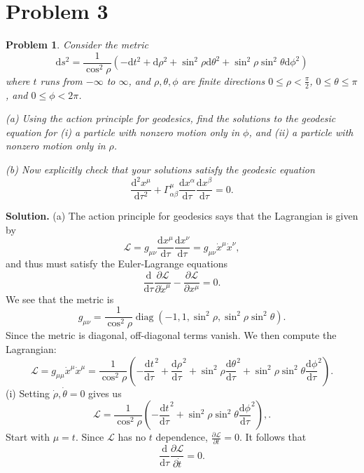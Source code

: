 \documentclass[11pt, letterpaper]{article}
\theoremstyle{plain}
\newtheorem{problem}{Problem}[section]
\begin{document}
\section{Problem 3}
\begin{problem}
	Consider the metric
	\[
		\mathrm{d} s^2=\frac{1}{\cos ^2\rho } \left( -\mathrm{d} t^2+\mathrm{d} \rho ^2+\sin ^2\rho \mathrm{d} \theta ^2+\sin ^2\rho \sin ^2\theta \mathrm{d} \phi ^2 \right) 
	\]
	where $t$ runs from $-\infty$ to $\infty $, and $\rho ,\theta ,\phi $ are finite directions $0\leq \rho < \frac{\pi }{2} $, $0\leq \theta \leq \pi $, and $0\leq \phi <2\pi $.

	(a) Using the action principle for geodesics, find the solutions to the geodesic equation for (i) a particle with nonzero motion only in $\phi $, and (ii) a particle with nonzero motion only in $\rho $.

	(b) Now explicitly check that your solutions satisfy the geodesic equation
	\[
		\frac{\mathrm{d}^2x^\mu }{\mathrm{d}\tau ^2} +\Gamma ^\mu _{\alpha \beta } \frac{\mathrm{d}x^\alpha }{\mathrm{d}\tau } \frac{\mathrm{d}x^\beta }{\mathrm{d}\tau } =0
	.\]
\end{problem}
\noindent\textbf{Solution.} (a) The action principle for geodesics says that the Lagrangian is given by
\[
	\mathcal{L} =g_{\mu \nu } \frac{\mathrm{d}x^\mu }{\mathrm{d}\tau } \frac{\mathrm{d}x^\nu }{\mathrm{d}\tau } =g_{\mu \nu } \dot{x} ^\mu \dot{x} ^\nu ,
\]
and thus must satisfy the Euler-Lagrange equations
\[
	\frac{\mathrm{d}}{\mathrm{d}\tau } \frac{\partial \mathcal{L} }{\partial \dot{x} ^\mu } -\frac{\partial \mathcal{L} }{\partial x^\mu } =0
.\]
We see that the metric is
\[
	g_{\mu \nu } =\frac{1}{\cos ^2\rho }\operatorname{diag} (-1,1,\sin ^2\rho ,\sin ^2\rho \sin ^2\theta )
.\]
Since the metric is diagonal, off-diagonal terms vanish. We then compute the Lagrangian:
\[
	\mathcal{L} =g_{\mu \mu }\dot{x}^\mu \dot{x} ^\mu =\frac{1}{\cos ^2\rho } \left(-\frac{\mathrm{d}t}{\mathrm{d}\tau } ^2+\frac{\mathrm{d}\rho }{\mathrm{d}\tau } ^2+\sin ^2\rho \frac{\mathrm{d}\theta }{\mathrm{d}\tau } ^2+\sin ^2\rho \sin ^2\theta \frac{\mathrm{d}\phi }{\mathrm{d}\tau } ^2\right)
.\]
(i) Setting $\dot{\rho } ,\dot{\theta }=0$ gives us
\[
	\mathcal{L} =\frac{1}{\cos ^2\rho} \left( -\frac{\mathrm{d}t}{\mathrm{d}\tau } ^2+\sin ^2\rho \sin ^2\theta \frac{\mathrm{d}\phi }{\mathrm{d}\tau } ^2 \right) ,
.\]
Start with $\mu =t$. Since $\mathcal{L} $ has no $t$ dependence, $\frac{\partial \mathcal{L} }{\partial t} =0$. It follows that
\[
	\frac{\mathrm{d}}{\mathrm{d}\tau } \frac{\partial \mathcal{L} }{\partial \dot{t}} =0
.\]
\end{document}
